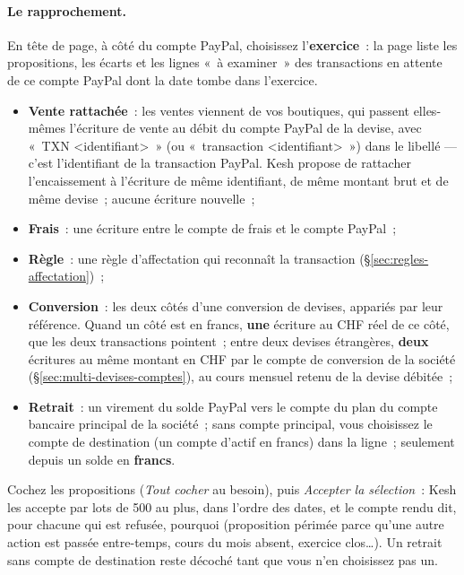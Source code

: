 \documentclass[a4paper,11pt,oneside]{article}
\begin{document}
\paragraph{Le rapprochement.} En tête de page, à côté du compte PayPal, choisissez l'\textbf{exercice}~: la page liste les propositions, les écarts et les lignes «~à examiner~» des transactions en attente de ce compte PayPal dont la date tombe dans l'exercice.
\begin{itemize}
    \item \textbf{Vente rattachée}~: les ventes viennent de vos boutiques, qui passent elles-mêmes l'écriture de vente au débit du compte PayPal de la devise, avec «~TXN <identifiant>~» (ou «~transaction <identifiant>~») dans le libellé --- c'est l'identifiant de la transaction PayPal. Kesh propose de rattacher l'encaissement à l'écriture de même identifiant, de même montant brut et de même devise~; aucune écriture nouvelle~;
    \item \textbf{Frais}~: une écriture entre le compte de frais et le compte PayPal~;
    \item \textbf{Règle}~: une règle d'affectation qui reconnaît la transaction (\S\ref{sec:regles-affectation})~;
    \item \textbf{Conversion}~: les deux côtés d'une conversion de devises, appariés par leur référence. Quand un côté est en francs, \textbf{une} écriture au CHF réel de ce côté, que les deux transactions pointent~; entre deux devises étrangères, \textbf{deux} écritures au même montant en CHF par le compte de conversion de la société (\S\ref{sec:multi-devises-comptes}), au cours mensuel retenu de la devise débitée~;
    \item \textbf{Retrait}~: un virement du solde PayPal vers le compte du plan du compte bancaire principal de la société~; sans compte principal, vous choisissez le compte de destination (un compte d'actif en francs) dans la ligne~; seulement depuis un solde en \textbf{francs}.
\end{itemize}
Cochez les propositions (\emph{Tout cocher} au besoin), puis \emph{Accepter la sélection}~: Kesh les accepte par lots de 500 au plus, dans l'ordre des dates, et le compte rendu dit, pour chacune qui est refusée, pourquoi (proposition périmée parce qu'une autre action est passée entre-temps, cours du mois absent, exercice clos\ldots). Un retrait sans compte de destination reste décoché tant que vous n'en choisissez pas un.
\end{document}
